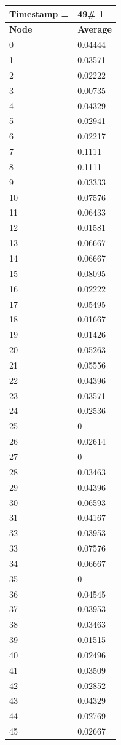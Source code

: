 \begin{tabular}{|l||l|}
\hline
\textbf{Timestamp =} & \textbf{49}\# 1\\\hline
	\textbf{Node} & \textbf{Average} \\ \hline
\hline
	0 & 0.04444 \\ \hline
	1 & 0.03571 \\ \hline
	2 & 0.02222 \\ \hline
	3 & 0.00735 \\ \hline
	4 & 0.04329 \\ \hline
	5 & 0.02941 \\ \hline
	6 & 0.02217 \\ \hline
	7 & 0.1111 \\ \hline
	8 & 0.1111 \\ \hline
	9 & 0.03333 \\ \hline
	10 & 0.07576 \\ \hline
	11 & 0.06433 \\ \hline
	12 & 0.01581 \\ \hline
	13 & 0.06667 \\ \hline
	14 & 0.06667 \\ \hline
	15 & 0.08095 \\ \hline
	16 & 0.02222 \\ \hline
	17 & 0.05495 \\ \hline
	18 & 0.01667 \\ \hline
	19 & 0.01426 \\ \hline
	20 & 0.05263 \\ \hline
	21 & 0.05556 \\ \hline
	22 & 0.04396 \\ \hline
	23 & 0.03571 \\ \hline
	24 & 0.02536 \\ \hline
	25 & 0 \\ \hline
	26 & 0.02614 \\ \hline
	27 & 0 \\ \hline
	28 & 0.03463 \\ \hline
	29 & 0.04396 \\ \hline
	30 & 0.06593 \\ \hline
	31 & 0.04167 \\ \hline
	32 & 0.03953 \\ \hline
	33 & 0.07576 \\ \hline
	34 & 0.06667 \\ \hline
	35 & 0 \\ \hline
	36 & 0.04545 \\ \hline
	37 & 0.03953 \\ \hline
	38 & 0.03463 \\ \hline
	39 & 0.01515 \\ \hline
	40 & 0.02496 \\ \hline
	41 & 0.03509 \\ \hline
	42 & 0.02852 \\ \hline
	43 & 0.04329 \\ \hline
	44 & 0.02769 \\ \hline
	45 & 0.02667 \\ \hline
\end{tabular}
